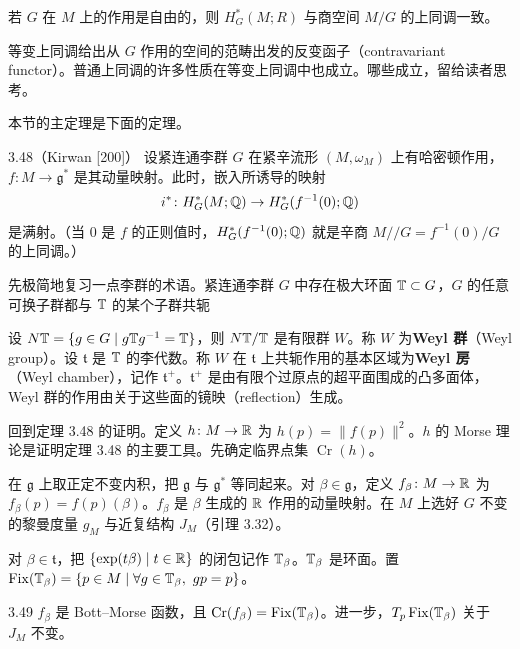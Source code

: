 若 $G$ 在 $M$ 上的作用是自由的，则 $H^*_G(M;R)$ 与商空间 $M/G$ 的上同调一致。


等变上同调给出从 $G$ 作用的空间的范畴出发的反变函子（contravariant functor）。普通上同调的许多性质在等变上同调中也成立。哪些成立，留给读者思考。

本节的主定理是下面的定理。

\begin{theorem}{3.48（Kirwan [200]）}
  设紧连通李群 $G$ 在紧辛流形 $(M,\omega_M)$ 上有哈密顿作用，$f\colon M\to\mathfrak{g}^*$ 是其动量映射。此时，嵌入所诱导的映射
  \[
    i^*\colon H^*_G(M;\mathbb{Q})\to H^*_G(f^{-1}(0);\mathbb{Q})
  \]
  是满射。（当 $0$ 是 $f$ 的正则值时，$H^*_G(f^{-1}(0);\mathbb{Q})$ 就是辛商 $M/\!/G=f^{-1}(0)/G$ 的上同调。）
\end{theorem}

先极简地复习一点李群的术语。紧连通李群 $G$ 中存在极大环面 $\mathbb{T}\subset G$，$G$ 的任意可换子群都与 $\mathbb{T}$ 的某个子群共轭

设 $N\mathbb{T}=\{g\in G\mid g\mathbb{T} g^{-1}=\mathbb{T}\}$，则 $N\mathbb{T}/\mathbb{T}$ 是有限群 $W$。称 $W$ 为\textbf{Weyl 群}（Weyl group）。设 $\mathfrak{t}$ 是 $\mathbb{T}$ 的李代数。称 $W$ 在 $\mathfrak{t}$ 上共轭作用的基本区域为\textbf{Weyl 房}（Weyl chamber），记作 $\mathfrak{t}^+$。$\mathfrak{t}^+$ 是由有限个过原点的超平面围成的凸多面体，Weyl 群的作用由关于这些面的镜映（reflection）生成。

回到定理 3.48 的证明。定义 $h\colon M\to\mathbb{R}$ 为 $h(p)=\|f(p)\|^2$。$h$ 的 Morse 理论是证明定理 3.48 的主要工具。先确定临界点集 $\operatorname{Cr}(h)$。

在 $\mathfrak{g}$ 上取正定不变内积，把 $\mathfrak{g}$ 与 $\mathfrak{g}^*$ 等同起来。对 $\beta\in\mathfrak{g}$，定义 $f_\beta\colon M\to\mathbb{R}$ 为 $f_\beta(p)=f(p)(\beta)$。$f_\beta$ 是 $\beta$ 生成的 $\mathbb{R}$ 作用的动量映射。在 $M$ 上选好 $G$ 不变的黎曼度量 $g_M$ 与近复结构 $J_M$（引理 3.32）。

对 $\beta\in\mathfrak{t}$，把 $\{\exp(t\beta)\mid t\in\mathbb{R}\}$ 的闭包记作 $\mathbb{T}_\beta$。$\mathbb{T}_\beta$ 是环面。置 $\operatorname{Fix}(\mathbb{T}_\beta)=\{p\in M\mid\forall g\in\mathbb{T}_\beta,\ gp=p\}$。

\begin{lemma*}{3.49}
  $f_\beta$ 是 Bott–Morse 函数，且 $\operatorname{Cr}(f_\beta)=\operatorname{Fix}(\mathbb{T}_\beta)$。进一步，$T_p\operatorname{Fix}(\mathbb{T}_\beta)$ 关于 $J_M$ 不变。
\end{lemma*}

